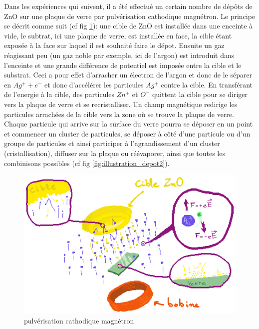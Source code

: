 \documentclass[a4paper,12pt,oneside]{article}
\begin{document}
Dans les expériences qui suivent, il a été effectué un certain nombre de dépôts de ZnO sur une plaque de verre par pulvérisation cathodique magnétron. Le principe se décrit comme suit (cf fig \ref{fig:illustration_depot}): une cible de ZnO est installée dans une enceinte à vide, le subtrat, ici une plaque de verre, est installée en face, la cible étant exposée à la face sur laquel il est souhaité faire le dépot. Ensuite un gaz réagissant peu (un gaz noble par exemple, ici de l'argon) est introduit dans l'enceinte et une grande différence de potentiel est imposée entre la cible et le substrat. Ceci a pour effet d'arracher un électron de l'argon et donc de le séparer en $Ag^+ + e^-$ et donc d'accélérer les particules $Ag^+$ contre la cible. En transférant de l'energie à la cible, des particules $Zn^+$ et $O^-$ quittent la cible pour se diriger vers la plaque de verre et se recristalliser. Un champ magnétique redirige les particules arrachées de la cible vers la zone où se trouve la plaque de verre. Chaque particule qui arrive sur la surface du verre pourra se déposer en un point et commencer un cluster de particules, se déposer à côté d'une particule ou d'un groupe de particules et ainsi participer à l'agrandissement d'un cluster (cristallisation), diffuser sur la plaque ou réévaporer, ainsi que toutes les combinisons possibles (cf fig \ref{fig:illustration_depot2}).

\begin{figure}[h!]
	\begin{center}
	\includegraphics[width=1.\linewidth,angle=0]{./figures/illustration_depot.png}
	\caption{pulvérisation cathodique magnétron} \label{fig:illustration_depot}
	\end{center}
\end{figure}
\end{document}
